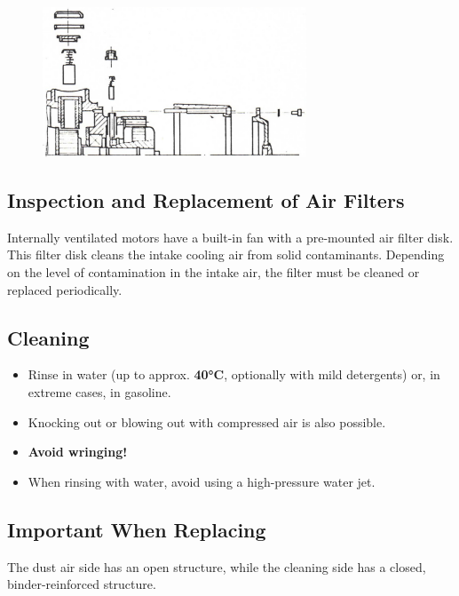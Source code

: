 \begin{figure}[H]
    \centering
    \includegraphics[width=0.7\textwidth]{images/chapter7/air_filter_assembly.jpg}
    \label{fig:air_filter_assembly}
\end{figure}

\subsection*{Inspection and Replacement of Air Filters}

Internally ventilated motors have a built-in fan with a pre-mounted air filter disk.  
This filter disk cleans the intake cooling air from solid contaminants.  
Depending on the level of contamination in the intake air, the filter must be cleaned or replaced periodically.

\newpage

\subsection*{Cleaning}

\begin{itemize}
    \setlength{\itemsep}{0pt} \setlength{\parskip}{0pt}
    \item Rinse in water (up to approx. \textbf{40°C}, optionally with mild detergents)  
          or, in extreme cases, in gasoline.
    \item Knocking out or blowing out with compressed air is also possible.
    \item \textbf{Avoid wringing!}
    \item When rinsing with water, avoid using a high-pressure water jet.
\end{itemize}

\subsection*{Important When Replacing}

The dust air side has an open structure, while the cleaning side has a closed,  
binder-reinforced structure.

